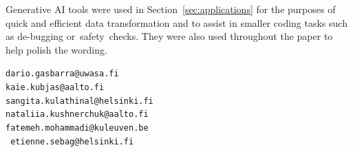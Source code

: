 \documentclass[11pt, a4paper]{article}
\numberwithin{equation}{section}
\theoremstyle{plain}
\theoremstyle{definition}
\begin{document}
Generative AI tools were used in Section~\ref{sec:applications} for the purposes of quick and efficient data transformation and to assist in smaller coding tasks such as de-bugging or~safety~checks. They were also used throughout the paper to help polish the wording.




\bigskip

{\small{}

\medskip
{} \hfill {\tt dario.gasbarra@uwasa.fi}
\\
\hfill {\tt kaie.kubjas@aalto.fi}
\\ 
 \hfill {\tt sangita.kulathinal@helsinki.fi}
\\
\hfill {\tt  nataliia.kushnerchuk@aalto.fi} 
\\
 \hfill {\tt fatemeh.mohammadi@kuleuven.be}
\\ 
 \hfill{\tt
etienne.sebag@helsinki.fi}}
\newpage\appendix
\end{document}
